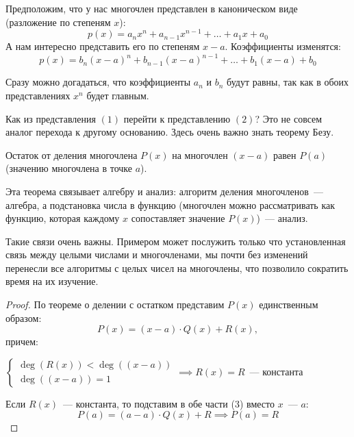 \documentclass[russian]{lecture-notes}
\theoremstyle{definition}
\DeclareMathOperator{\Deg}{deg}
\newcommand{\D}[1]{\Deg(#1)}
\begin{document}
    Предположим, что у нас многочлен представлен в каноническом виде (разложение по степеням $x$):
    \begin{equation}
        p(x) = a_nx^n + a_{n-1}x^{n-1} + \ldots + a_1x + a_0
    \end{equation}
    А нам интересно представить его по степеням $x-a$. Коэффициенты изменятся:
    \begin{equation}
        p(x) = b_n(x-a)^n + b_{n-1}(x-a)^{n-1} + \ldots + b_1(x-a) + b_0
    \end{equation}

    \begin{note}
        Сразу можно догадаться, что коэффициенты $a_n$ и $b_n$ будут равны, так как в обоих представлениях $x^n$ будет главным.
    \end{note}

    Как из представления $(1)$ перейти к представлению $(2)$? Это не совсем аналог перехода к другому основанию. Здесь очень важно знать теорему Безу.
    \begin{theorem}[Безу]
        Остаток от деления многочлена $P(x)$ на многочлен $(x-a)$ равен $P(a)$ (значению многочлена в точке $a$).
    \end{theorem}

    \begin{note}
        Эта теорема связывает алгебру и анализ: алгоритм деления многочленов~--- алгебра, а подстановка числа в функцию (многочлен можно рассматривать как функцию, которая каждому $x$ сопоставляет значение $P(x)$)~--- анализ.

        Такие связи очень важны. Примером может послужить только что установленная связь между целыми числами и многочленами, мы почти без изменений перенесли все алгоритмы с целых чисел на многочлены, что позволило сократить время на их изучение.
    \end{note}

    \begin{proof}
        По теореме о делении с остатком представим $P(x)$ единственным образом:
        \begin{equation}
            P(x) = (x-a) \cdot Q(x) + R(x),
        \end{equation}
        причем:

        $\begin{cases}
             \D{R(x)} < \D{(x-a)}\\
             \D{(x-a)} = 1
        \end{cases} \implies R(x) = R$~--- константа

        \noindent Если $R(x)$~--- константа, то подставим в обе части (3) вместо $x$~--- $a$:
        \[
            P(a) = (a-a) \cdot Q(x) + R \implies P(a) = R
        \]

    \end{proof}
\end{document}
